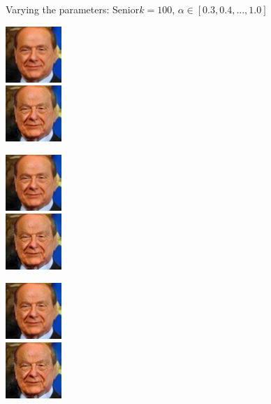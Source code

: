 \documentclass[11pt]{beamer}
\begin{document}
\begin{frame}{Varying the parameters: Senior}{$k=100$, $\alpha \in [0.3, 0.4, \dots, 1.0]$}
	\centering
	\begin{minipage}{81px}
		\includegraphics[width=80px]{../pictures/outputs/alpha_k/Senior/k100/Silvio_Berlusconi_0023_alpha-0.3_k-1002017-02-07_13-39-13.png}\\
		\includegraphics[width=80px]{../pictures/outputs/alpha_k/Senior/k100/Silvio_Berlusconi_0023_alpha-0.7_k-1002017-02-07_15-39-04.png}
	\end{minipage}%
	\begin{minipage}{81px}
		\includegraphics[width=80px]{../pictures/outputs/alpha_k/Senior/k100/Silvio_Berlusconi_0023_alpha-0.4_k-1002017-02-07_14-02-37.png}\\
		\includegraphics[width=80px]{../pictures/outputs/alpha_k/Senior/k100/Silvio_Berlusconi_0023_alpha-0.8_k-1002017-02-07_16-16-14.png}
	\end{minipage}%
	\begin{minipage}{81px}
		\includegraphics[width=80px]{../pictures/outputs/alpha_k/Senior/k100/Silvio_Berlusconi_0023_alpha-0.5_k-1002017-02-07_14-28-35.png}\\
		\includegraphics[width=80px]{../pictures/outputs/alpha_k/Senior/k100/Silvio_Berlusconi_0023_alpha-0.9_k-1002017-02-07_16-42-01.png}

\end{minipage}
\end{frame}
\end{document}
